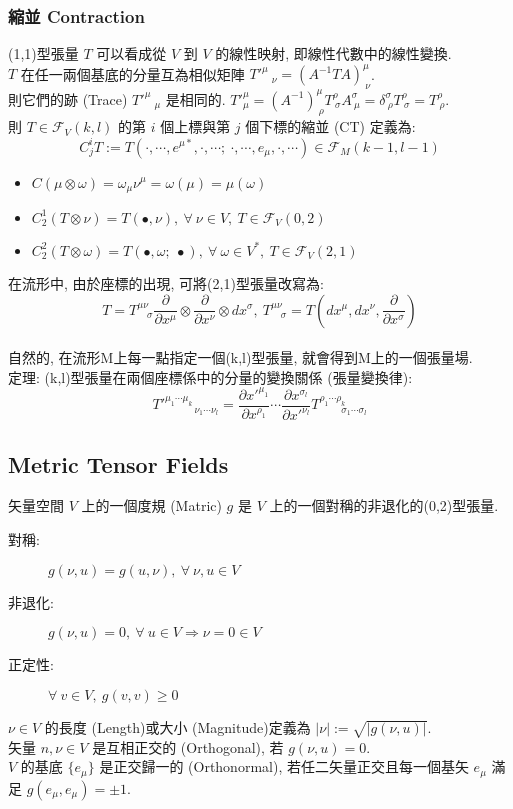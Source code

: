 \documentclass{article}
\begin{document}
\begin{CJK}{UTF8}{bsmi}
\subsubsection{縮並 Contraction}
(1,1)型張量 $T$ 可以看成從 $V$ 到 $V$ 的線性映射, 即線性代數中的線性變換.
\\$T$ 在任一兩個基底的分量互為相似矩陣 $T'^\mu_{\quad\nu}=(A^{-1}TA)^\mu_{\ \nu}$.
\\則它們的跡 (Trace) $T'^\mu_{\quad \mu}$ 是相同的. $T'^\mu_\mu=(A^{-1})^\mu_{\ \rho}T^\rho_{\ \sigma}A^\sigma_{ \ \mu}=\delta^\sigma_{\ \rho}T^\rho_{\ \sigma}=T^\rho_{\ \rho}$.
\\則 $T\in \mathscr{F}_V(k,l)$ 的第 $i$ 個上標與第 $j$ 個下標的縮並 (CT) 定義為: $$C^i_jT:=T(\cdot,\cdots,e^{\mu*},\cdot,\cdots;\ \cdot,\cdots,e_\mu,\cdot,\cdots)\in\mathscr{F}_M(k-1,l-1) $$
\begin{itemize}
  \item $C(\mu\otimes\omega)=\omega_\mu\nu^\mu=\omega(\mu)=\mu(\omega)$
  \item $C^1_2(T\otimes \nu )=T(\bullet,\nu),\ \forall\ \nu\in V,\ T\in\mathscr{F}_V(0,2)$
  \item $C^2_2(T\otimes \omega)=T(\bullet,\omega;\ \bullet),\ \forall\ \omega\in V^*,\ T\in\mathscr{F}_V(2,1)$
\end{itemize}
在流形中, 由於座標的出現, 可將(2,1)型張量改寫為: $$T=T^{\mu \nu }_{\quad \sigma}\frac{\partial }{\partial x^\mu}\otimes \frac{\partial}{\partial x^\nu}\otimes dx^\sigma,\ T^{\mu \nu }_{\quad \sigma}=T(dx^\mu,dx^\nu,\frac{\partial}{\partial x^\sigma})$$
\\ 自然的, 在流形M上每一點指定一個(k,l)型張量, 就會得到M上的一個張量場.
\\

定理: (k,l)型張量在兩個座標係中的分量的變換關係 (張量變換律): $$T'^{\mu_1 \cdots \mu _k}_{\quad\quad \quad \nu_1\cdots \nu _l}=\frac{\partial x'^{\mu_1}}{\partial x^{\rho _1}}\cdots \frac{\partial x^{\sigma_l}}{\partial x'^{\nu _l}} T^{\rho_1\cdots\rho_k}_{\quad\quad\ \sigma_1\cdots\sigma_l} $$
\subsection{Metric Tensor Fields}
矢量空間 $V$ 上的一個度規 (Matric) $g$ 是 $V$ 上的一個對稱的非退化的(0,2)型張量.\begin{description}
  \item[對稱:] $g(\nu,u)=g(u,\nu),\ \forall\ \nu,u \in V$
   \item[非退化:] $g(\nu,u)=0,\ \forall\ u\in V\Rightarrow \nu=0\in V$
   \item[正定性:] $\forall\ v\in V,\ g(v, v)\geqslant 0$
\end{description}
$\nu\in V$ 的長度 (Length)或大小 (Magnitude)定義為 $|\nu|:=\sqrt{|g(\nu,u)|}$.
\\矢量 $n,\nu\in V$ 是互相正交的 (Orthogonal), 若 $g(\nu,u)=0$.
\\ $V$ 的基底 $\{ e_\mu\}$ 是正交歸一的 (Orthonormal), 若任二矢量正交且每一個基矢 $e_\mu$ 滿足 $g(e_\mu,e_\mu)=\pm 1$.
\\


\end{CJK}
\end{document}
